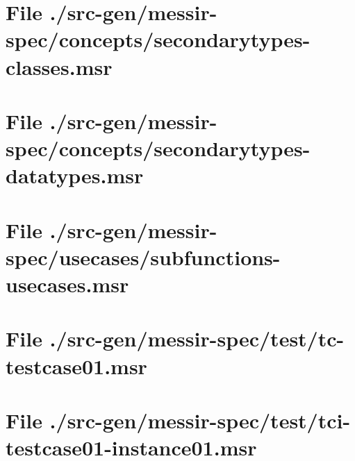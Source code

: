 \section[File /src-gen/messir-spec/concepts/secondarytypes-classes.msr]{File ./src-gen/messir-spec/concepts/secondarytypes-classes.msr}
\scriptsize

\normalsize
	
\section[File /src-gen/messir-spec/concepts/secondarytypes-datatypes.msr]{File ./src-gen/messir-spec/concepts/secondarytypes-datatypes.msr}
\scriptsize

\normalsize
	
\section[File /src-gen/messir-spec/usecases/subfunctions-usecases.msr]{File ./src-gen/messir-spec/usecases/subfunctions-usecases.msr}
\scriptsize

\normalsize
	
\section[File /src-gen/messir-spec/test/tc-testcase01.msr]{File ./src-gen/messir-spec/test/tc-testcase01.msr}
\scriptsize

\normalsize
	
\section[File /src-gen/messir-spec/test/tci-testcase01-instance01.msr]{File ./src-gen/messir-spec/test/tci-testcase01-instance01.msr}
\scriptsize

\normalsize
	
